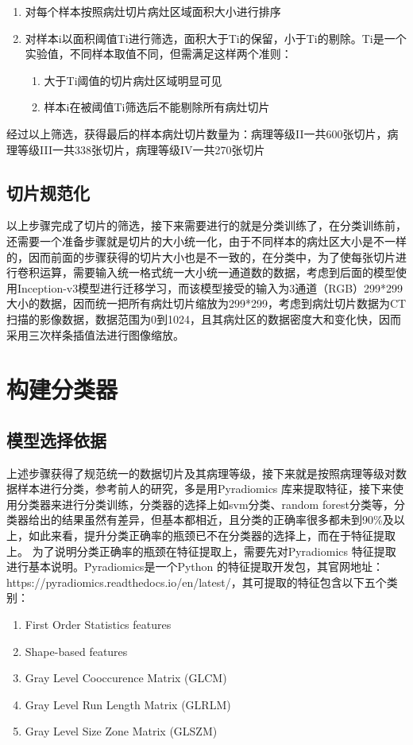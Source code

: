\documentclass{ctexart}
\begin{document}
\begin{enumerate}
\item 对每个样本按照病灶切片病灶区域面积大小进行排序
\item 对样本i以面积阈值Ti进行筛选，面积大于Ti的保留，小于Ti的剔除。Ti是一个实验值，不同样本取值不同，但需满足这样两个准则：
\begin{enumerate}
\item 大于Ti阈值的切片病灶区域明显可见
\item 样本i在被阈值Ti筛选后不能剔除所有病灶切片
\end{enumerate}
\end{enumerate}
经过以上筛选，获得最后的样本病灶切片数量为：病理等级II一共600张切片，病理等级III一共338张切片，病理等级IV一共270张切片

\subsection{切片规范化}
以上步骤完成了切片的筛选，接下来需要进行的就是分类训练了，在分类训练前，还需要一个准备步骤就是切片的大小统一化，由于不同样本的病灶区大小是不一样的，因而前面的步骤获得的切片大小也是不一致的，在分类中，为了使每张切片进行卷积运算，需要输入统一格式统一大小统一通道数的数据，考虑到后面的模型使用Inception-v3模型进行迁移学习，而该模型接受的输入为3通道（RGB）299*299大小的数据，因而统一把所有病灶切片缩放为299*299，考虑到病灶切片数据为CT扫描的影像数据，数据范围为0到1024，且其病灶区的数据密度大和变化快，因而采用三次样条插值法进行图像缩放。

\section{构建分类器}
\subsection{模型选择依据}
上述步骤获得了规范统一的数据切片及其病理等级，接下来就是按照病理等级对数据样本进行分类，参考前人的研究，多是用Pyradiomics 库来提取特征，接下来使用分类器来进行分类训练，分类器的选择上如svm分类、random forest分类等，分类器给出的结果虽然有差异，但基本都相近，且分类的正确率很多都未到90\%及以上，如此来看，提升分类正确率的瓶颈已不在分类器的选择上，而在于特征提取上。
为了说明分类正确率的瓶颈在特征提取上，需要先对Pyradiomics 特征提取进行基本说明。Pyradiomics是一个Python 的特征提取开发包，其官网地址：https://pyradiomics.readthedocs.io/en/latest/，其可提取的特征包含以下五个类别：
\begin{enumerate}
\item First Order Statistics features
\item Shape-based features
\item Gray Level Cooccurence Matrix (GLCM)
\item Gray Level Run Length Matrix (GLRLM)
\item Gray Level Size Zone Matrix (GLSZM)
\end{enumerate}
\end{document}
